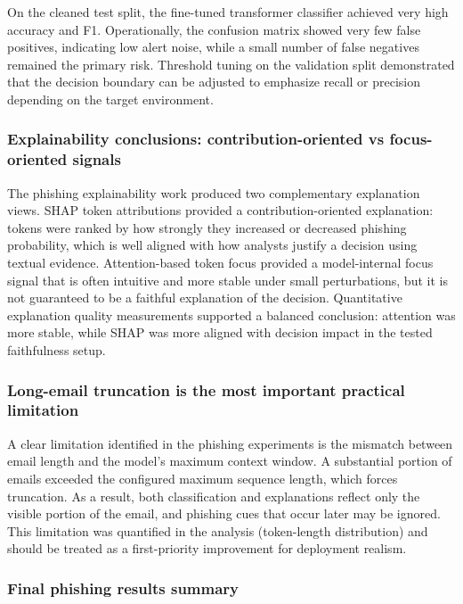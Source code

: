 \documentclass[conference]{IEEEtran}
\begin{document}
On the cleaned test split, the fine-tuned transformer classifier achieved very high accuracy and F1. Operationally, the confusion matrix showed very few false positives, indicating low alert noise, while a small number of false negatives remained the primary risk. Threshold tuning on the validation split demonstrated that the decision boundary can be adjusted to emphasize recall or precision depending on the target environment.

\subsubsection{Explainability conclusions: contribution-oriented vs focus-oriented signals}

The phishing explainability work produced two complementary explanation views. SHAP token attributions provided a contribution-oriented explanation: tokens were ranked by how strongly they increased or decreased phishing probability, which is well aligned with how analysts justify a decision using textual evidence. Attention-based token focus provided a model-internal focus signal that is often intuitive and more stable under small perturbations, but it is not guaranteed to be a faithful explanation of the decision. Quantitative explanation quality measurements supported a balanced conclusion: attention was more stable, while SHAP was more aligned with decision impact in the tested faithfulness setup.

\subsubsection{Long-email truncation is the most important practical limitation}

A clear limitation identified in the phishing experiments is the mismatch between email length and the model’s maximum context window. A substantial portion of emails exceeded the configured maximum sequence length, which forces truncation. As a result, both classification and explanations reflect only the visible portion of the email, and phishing cues that occur later may be ignored. This limitation was quantified in the analysis (token-length distribution) and should be treated as a first-priority improvement for deployment realism.

\subsubsection{Final phishing results summary}
\end{document}

